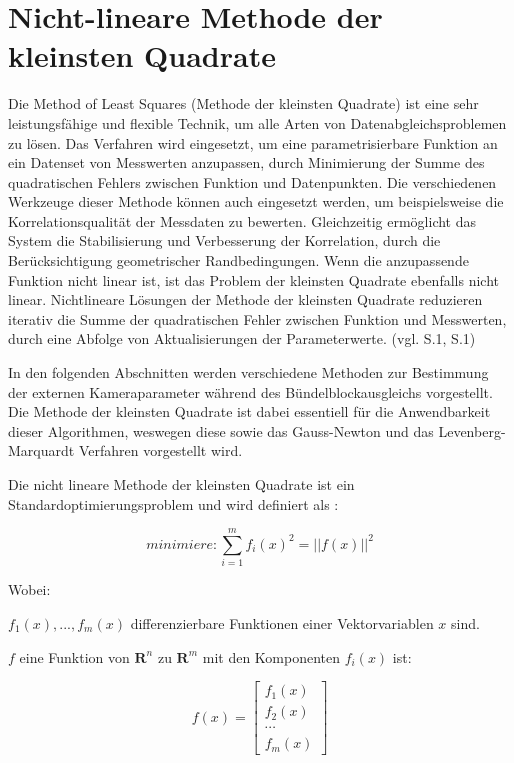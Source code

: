 \section{Nicht-lineare Methode der kleinsten Quadrate}
Die \glqq Method of Least Squares\grqq{} (Methode der kleinsten Quadrate) ist eine sehr leistungsfähige und flexible Technik, um alle Arten von Datenabgleichsproblemen zu lösen. Das Verfahren wird eingesetzt, um eine parametrisierbare Funktion an ein Datenset von Messwerten anzupassen, durch Minimierung der Summe des quadratischen Fehlers zwischen Funktion und Datenpunkten. Die verschiedenen Werkzeuge dieser Methode können auch eingesetzt werden, um beispielsweise die Korrelationsqualität der Messdaten zu bewerten. Gleichzeitig ermöglicht das System die Stabilisierung und Verbesserung der Korrelation, durch die Berücksichtigung geometrischer Randbedingungen. Wenn die anzupassende Funktion nicht linear ist, ist das Problem der kleinsten Quadrate ebenfalls nicht linear. Nichtlineare Lösungen der Methode der kleinsten Quadrate reduzieren iterativ die Summe der quadratischen Fehler zwischen Funktion und Messwerten, durch eine Abfolge von Aktualisierungen der Parameterwerte. (vgl. \cite{least_quares} S.1, \cite{lev_mar} S.1)

In den folgenden Abschnitten werden verschiedene Methoden zur Bestimmung der externen Kameraparameter während des Bündelblockausgleichs vorgestellt. Die Methode der kleinsten Quadrate ist dabei essentiell für die Anwendbarkeit dieser Algorithmen, weswegen diese sowie das Gauss-Newton und das Levenberg-Marquardt Verfahren vorgestellt wird. 

Die nicht lineare Methode der kleinsten Quadrate ist ein Standardoptimierungsproblem und wird definiert als \cite{nonlinear_1} :

\begin{equation}
minimiere: \sum_{i=1}^m f_i(x)^2 =  ||f(x)||^2
\end{equation} 

Wobei: 

$f_1(x),...,f_m(x)$ differenzierbare Funktionen einer Vektorvariablen $x$ sind.

$f$ eine Funktion von $\textbf{R}^n$ zu $\textbf{R}^m$ mit den Komponenten $f_i(x)$ ist:

\begin{equation}
f(x) = \begin{bmatrix}
f_1(x)\\ f_2(x)\\ \cdots \\ f_m(x)
\end{bmatrix}
\end{equation} 

